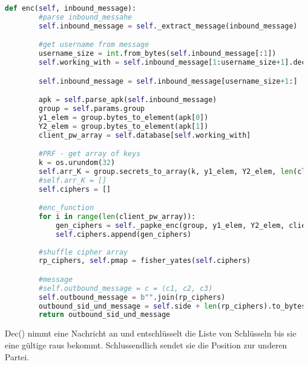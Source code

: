 \documentclass[conference, compsoc]{IEEEtran}
\begin{document}
\begin{lstlisting}[language=Python]
def enc(self, inbound_message):
        #parse inbound_messahe
        self.inbound_message = self._extract_message(inbound_message)

        #get username from message
        username_size = int.from_bytes(self.inbound_message[:1])
        self.working_with = self.inbound_message[1:username_size+1].decode('utf-8')

        self.inbound_message = self.inbound_message[username_size+1:]

        apk = self.parse_apk(self.inbound_message)
        group = self.params.group
        y1_elem = group.bytes_to_element(apk[0])
        Y2_elem = group.bytes_to_element(apk[1])
        client_pw_array = self.database[self.working_with]

        #PRF - get array of keys
        k = os.urundom(32)
        self.arr_K = group.secrets_to_array(k, y1_elem, Y2_elem, len(client_pw_array), 32)
        #self.arr_K = []
        self.ciphers = []

        #enc_function
        for i in range(len(client_pw_array)):
            gen_ciphers = self._papke_enc(group, y1_elem, Y2_elem, client_pw_array[i], self.arr_K[i])
            self.ciphers.append(gen_ciphers)
        
        #shuffle cipher array
        rp_ciphers, self.pmap = fisher_yates(self.ciphers)

        #message
        #self.outbound_message = c = (c1, c2, c3)
        self.outbound_message = b"".join(rp_ciphers)
        outbound_sid_und_message = self.side + len(rp_ciphers).to_bytes() + self.outbound_message
        return outbound_sid_und_message
\end{lstlisting}

Dec() nimmt eine Nachricht an und entschlüsselt die Liste von Schlüsseln bis sie eine gültige
raus bekommt. Schlussendlich sendet sie die Position zur underen Partei.
\end{document}
